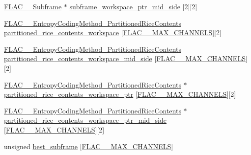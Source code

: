 \begin{DoxyCompactItemize}
\hyperlink{struct_f_l_a_c_____subframe}{F\+L\+A\+C\+\_\+\+\_\+\+Subframe} $\ast$ \hyperlink{struct_f_l_a_c_____stream_encoder_private_a1ed6bd65d87323c2c303197fca9776d4}{subframe\+\_\+workspace\+\_\+ptr\+\_\+mid\+\_\+side} \mbox{[}2\mbox{]}\mbox{[}2\mbox{]}
\item 
\hyperlink{struct_f_l_a_c_____entropy_coding_method___partitioned_rice_contents}{F\+L\+A\+C\+\_\+\+\_\+\+Entropy\+Coding\+Method\+\_\+\+Partitioned\+Rice\+Contents} \hyperlink{struct_f_l_a_c_____stream_encoder_private_ae7fe07d7b7b7c55774a576aa831aab94}{partitioned\+\_\+rice\+\_\+contents\+\_\+workspace} \mbox{[}\hyperlink{group__flac__format_ga488aa5678a58d08f984f5d39185b763d}{F\+L\+A\+C\+\_\+\+\_\+\+M\+A\+X\+\_\+\+C\+H\+A\+N\+N\+E\+LS}\mbox{]}\mbox{[}2\mbox{]}
\item 
\hyperlink{struct_f_l_a_c_____entropy_coding_method___partitioned_rice_contents}{F\+L\+A\+C\+\_\+\+\_\+\+Entropy\+Coding\+Method\+\_\+\+Partitioned\+Rice\+Contents} \hyperlink{struct_f_l_a_c_____stream_encoder_private_a865692e0e93b34af579335f929795b6b}{partitioned\+\_\+rice\+\_\+contents\+\_\+workspace\+\_\+mid\+\_\+side} \mbox{[}\hyperlink{group__flac__format_ga488aa5678a58d08f984f5d39185b763d}{F\+L\+A\+C\+\_\+\+\_\+\+M\+A\+X\+\_\+\+C\+H\+A\+N\+N\+E\+LS}\mbox{]}\mbox{[}2\mbox{]}
\item 
\hyperlink{struct_f_l_a_c_____entropy_coding_method___partitioned_rice_contents}{F\+L\+A\+C\+\_\+\+\_\+\+Entropy\+Coding\+Method\+\_\+\+Partitioned\+Rice\+Contents} $\ast$ \hyperlink{struct_f_l_a_c_____stream_encoder_private_a4f5c42dbbe886728c7b7e443ecaf1280}{partitioned\+\_\+rice\+\_\+contents\+\_\+workspace\+\_\+ptr} \mbox{[}\hyperlink{group__flac__format_ga488aa5678a58d08f984f5d39185b763d}{F\+L\+A\+C\+\_\+\+\_\+\+M\+A\+X\+\_\+\+C\+H\+A\+N\+N\+E\+LS}\mbox{]}\mbox{[}2\mbox{]}
\item 
\hyperlink{struct_f_l_a_c_____entropy_coding_method___partitioned_rice_contents}{F\+L\+A\+C\+\_\+\+\_\+\+Entropy\+Coding\+Method\+\_\+\+Partitioned\+Rice\+Contents} $\ast$ \hyperlink{struct_f_l_a_c_____stream_encoder_private_ac989576ab8cf666cd1e8aca9f27ad18b}{partitioned\+\_\+rice\+\_\+contents\+\_\+workspace\+\_\+ptr\+\_\+mid\+\_\+side} \mbox{[}\hyperlink{group__flac__format_ga488aa5678a58d08f984f5d39185b763d}{F\+L\+A\+C\+\_\+\+\_\+\+M\+A\+X\+\_\+\+C\+H\+A\+N\+N\+E\+LS}\mbox{]}\mbox{[}2\mbox{]}
\item 
unsigned \hyperlink{struct_f_l_a_c_____stream_encoder_private_a116c8c3620f97421df2c7f5fd406b412}{best\+\_\+subframe} \mbox{[}\hyperlink{group__flac__format_ga488aa5678a58d08f984f5d39185b763d}{F\+L\+A\+C\+\_\+\+\_\+\+M\+A\+X\+\_\+\+C\+H\+A\+N\+N\+E\+LS}\mbox{]}

\end{DoxyCompactItemize}
